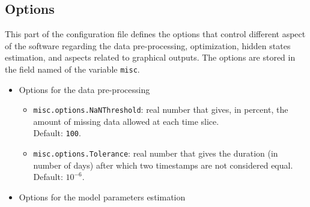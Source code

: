 \subsection{Options}
\label{SS:options}
This part of the configuration file defines the options that control different aspect of the software regarding the data pre-processing, optimization, hidden states estimation, and aspects related to graphical outputs.
The options are stored in the field named  of the \MATLAB{} variable \lstinline[basicstyle = \mlttfamily \small ]!misc!.
\begin{itemize}

\item Options for the data pre-processing

\begin{itemize}
\item \lstinline[basicstyle = \mlttfamily \small ]!misc.options.NaNThreshold!: real number that gives, in percent, the amount of missing data allowed at each time slice.\\Default: \lstinline[basicstyle = \mlttfamily \small ]!100!.
\item \lstinline[basicstyle = \mlttfamily \small ]!misc.options.Tolerance!: real number that gives the duration (in number of days) after which two timestamps are not considered equal. \\Default: $10^{-6}$.

\end{itemize}


\item Options for the model parameters estimation


\end{itemize}
